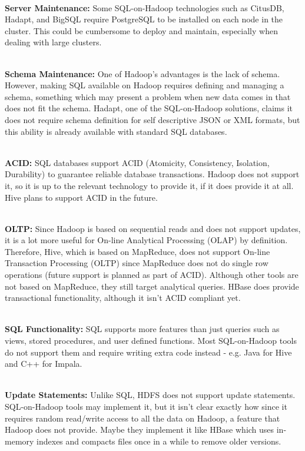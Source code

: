 \documentclass[twocolumn]{article}
\begin{document}
\noindent
\\
\textbf{Server Maintenance:}
Some SQL-on-Hadoop technologies such as CitusDB, Hadapt, and BigSQL require PostgreSQL to be installed on each node in the cluster. This could be cumbersome to deploy and maintain, especially when dealing with large clusters.

\noindent
\\
\textbf{Schema Maintenance:}
One of Hadoop’s advantages is the lack of schema. However, making SQL available on Hadoop requires defining and managing a schema, something which may present a problem when new data comes in that does not fit the schema. Hadapt, one of the SQL-on-Hadoop solutions, claims it does not require schema definition for self descriptive JSON or XML formats, but this ability is already available with standard SQL databases.

\noindent
\\
\textbf{ACID:}
SQL databases support ACID (Atomicity, Consistency, Isolation, Durability) to guarantee reliable database transactions. Hadoop does not support it, so it is up to the relevant technology to provide it, if it does provide it at all. Hive plans to support ACID in the future.

\noindent
\\
\textbf{OLTP:}
Since Hadoop is based on sequential reads and does not support updates, it is a lot more useful for On-line Analytical Processing (OLAP) by definition. Therefore, Hive, which is based on MapReduce, does not support On-line Transaction Processing (OLTP) since MapReduce does not do single row operations (future support is planned as part of ACID). Although other tools are not based on MapReduce, they still target analytical queries. HBase does provide transactional functionality, although it isn’t ACID compliant yet.

\noindent
\\
\textbf{SQL Functionality:}
SQL supports more features than just queries such as views, stored procedures, and user defined functions. Most SQL-on-Hadoop tools do not support them and require writing extra code instead - e.g. Java for Hive and C++ for Impala.

\noindent
\\
\textbf{Update Statements:}
Unlike SQL, HDFS does not support update statements. SQL-on-Hadoop tools may implement it, but it isn’t clear exactly how since it requires random read/write access to all the data on Hadoop, a feature that Hadoop does not provide. Maybe they implement it like HBase which uses in-memory indexes and compacts files once in a while to remove older versions.
\end{document}
